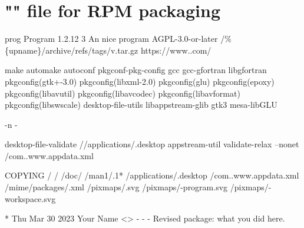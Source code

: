 \section{"" file for RPM packaging}
\label{spec}
\vspace{-1cm}
{\scriptsize{
\begin{script}
      prog
  Program
   1.2.12
   3
   An nice program
   AGPL-3.0-or-later
   \gitauth/\%\{upname\}/archive/refs/tags/v.tar.gz
        https://www..com/

 make
 automake
 autoconf
 pkgconf-pkg-config
 gcc
 gcc-gfortran
 libgfortran
 pkgconfig(gtk+-3.0)
 pkgconfig(libxml-2.0)
 pkgconfig(glu)
 pkgconfig(epoxy)
 pkgconfig(libavutil)
 pkgconfig(libavcodec)
 pkgconfig(libavformat)
 pkgconfig(libswscale)
 desktop-file-utils
 libappstream-glib
 gtk3
 mesa-libGLU

 -n -



desktop-file-validate //applications/.desktop
appstream-util validate-relax --nonet /com..www.appdata.xml

 COPYING
/
/
/doc/
/man1/.1*
/applications/.desktop
/com..www.appdata.xml
/mime/packages/.xml
/pixmaps/.svg
/pixmaps/-program.svg
/pixmaps/-workspace.svg

* Thu Mar 30 2023 Your Name <\email> - -
- Revised package: what you did here.
\end{script}
}}

